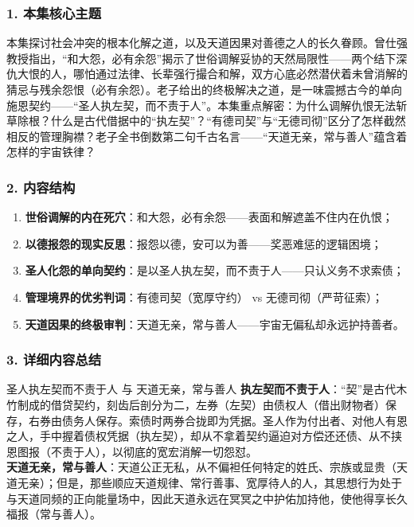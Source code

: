 \subsubsection{1. 本集核心主题}
本集探讨社会冲突的根本化解之道，以及天道因果对善德之人的长久眷顾。曾仕强教授指出，“和大怨，必有余怨”揭示了世俗调解妥协的天然局限性——两个结下深仇大恨的人，哪怕通过法律、长辈强行撮合和解，双方心底必然潜伏着未曾消解的猜忌与残余怨恨（必有余怨）。老子给出的终极解决之道，是一味震撼古今的单向施恩契约——“圣人执左契，而不责于人”。本集重点解密：为什么调解仇恨无法斩草除根？什么是古代借据中的“执左契”？“有德司契”与“无德司彻”区分了怎样截然相反的管理胸襟？老子全书倒数第二句千古名言——“天道无亲，常与善人”蕴含着怎样的宇宙铁律？

\subsubsection{2. 内容结构}
\begin{enumerate}
    \item \textbf{世俗调解的内在死穴}：和大怨，必有余怨——表面和解遮盖不住内在仇恨；
    \item \textbf{以德报怨的现实反思}：报怨以德，安可以为善——奖恶难惩的逻辑困境；
    \item \textbf{圣人化怨的单向契约}：是以圣人执左契，而不责于人——只认义务不求索债；
    \item \textbf{管理境界的优劣判词}：有德司契（宽厚守约） vs 无德司彻（严苛征索）；
    \item \textbf{天道因果的终极审判}：天道无亲，常与善人——宇宙无偏私却永远护持善者。
\end{enumerate}

\subsubsection{3. 详细内容总结}

\begin{ConceptBox}{圣人执左契而不责于人 与 天道无亲，常与善人}
\textbf{执左契而不责于人}：“契”是古代木竹制成的借贷契约，刻齿后剖分为二，左券（左契）由债权人（借出财物者）保存，右券由债务人保存。索债时两券合拢即为凭据。圣人作为付出者、对他人有恩之人，手中握着债权凭据（执左契），却从不拿着契约逼迫对方偿还还债、从不挟恩图报（不责于人），以彻底的宽宏消解一切怨怼。\\
\textbf{天道无亲，常与善人}：天道公正无私，从不偏袒任何特定的姓氏、宗族或显贵（天道无亲）；但是，那些顺应天道规律、常行善事、宽厚待人的人，其思想行为处于与天道同频的正向能量场中，因此天道永远在冥冥之中护佑加持他，使他得享长久福报（常与善人）。
\end{ConceptBox}

